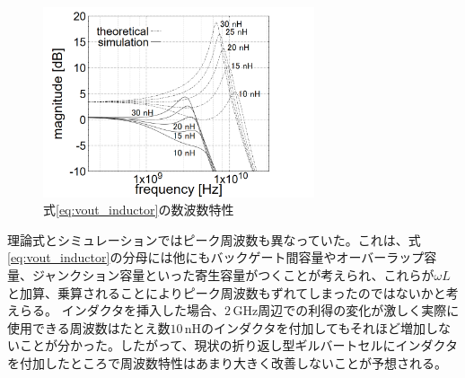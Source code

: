\documentclass[twocolumn]{jsarticle}
\begin{document}
    \begin{figure}[H]
        \begin{center}
            \includegraphics*[width = 80mm]{figures/inductor_monochrome.PNG}
            \caption{式\eqref{eq:vout_inductor}の数波数特性}
            \label{fig:inductor}
        \end{center}
    \end{figure}
    理論式とシミュレーションではピーク周波数も異なっていた。これは、式\eqref{eq:vout_inductor}の分母には他にもバックゲート間容量やオーバーラップ容量、ジャンクション容量といった寄生容量がつくことが考えられ、これらが$\omega L$と加算、乗算されることによりピーク周波数もずれてしまったのではないかと考えらる。
    インダクタを挿入した場合、$2\,\mathrm{GHz}$周辺での利得の変化が激しく実際に使用できる周波数はたとえ数$10\,\mathrm{nH}$のインダクタを付加してもそれほど増加しないことが分かった。したがって、現状の折り返し型ギルバートセルにインダクタを付加したところで周波数特性はあまり大きく改善しないことが予想される。
\end{document}

